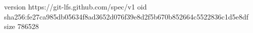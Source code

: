 version https://git-lfs.github.com/spec/v1
oid sha256:fe27ca985db05634f8ad3652d076f39e8d2f5b670b852664c5522836c1d5e8df
size 786528
